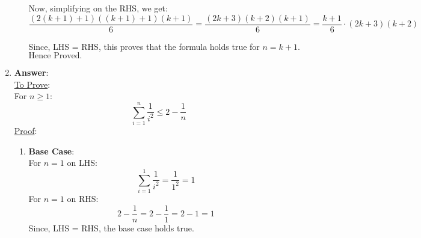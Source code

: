 \documentclass[11pt]{article}
\begin{document}
\begin{enumerate}
\begin{enumerate}
    Now, simplifying on the RHS, we get:
    \begin{equation*}
        \frac{(2(k+1)+1)((k+1)+1)(k+1)}{6} = \frac{(2k+3)(k+2)(k+1)}{6} = \frac{k+1}{6}\cdot(2k+3)(k+2)
    \end{equation*}

    Since, LHS = RHS, this proves that the formula holds true for $n = k + 1$.\\
$\text{Hence Proved.}$
\end{enumerate}

\item \textbf{Answer}:\\
\uline{To Prove}: \\
For $n \geq 1$:
\begin{equation*}
    \sum_{i=1}^{n} \frac{1}{i^2} \leq 2 - \frac{1}{n}
\end{equation*}
\uline{Proof}: \\
\begin{enumerate}
    \item \textbf{Base Case}:\\
    For $n = 1$ on LHS: \\
    \begin{equation*}
        \sum_{i=1}^{1} \frac{1}{i^2} = \frac{1}{1^2} = 1
    \end{equation*}
    For $n = 1$ on RHS: \\
    \begin{equation*}
        2 - \frac{1}{n} = 2 - \frac{1}{1} = 2 - 1 = 1
    \end{equation*}
    Since, LHS = RHS, the base case holds true. \\
    

\end{enumerate}
\end{enumerate}
\end{document}
